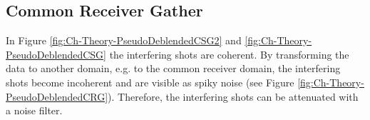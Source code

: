 \subsection{Common Receiver Gather}
In Figure \ref{fig:Ch-Theory-PseudoDeblendedCSG2} and \ref{fig:Ch-Theory-PseudoDeblendedCSG} the interfering shots are coherent. By transforming the data to another domain, e.g. to the common receiver domain, the interfering shots become incoherent  and are visible as spiky noise (see Figure \ref{fig:Ch-Theory-PseudoDeblendedCRG}). Therefore, the interfering shots can be attenuated with a noise filter. 


